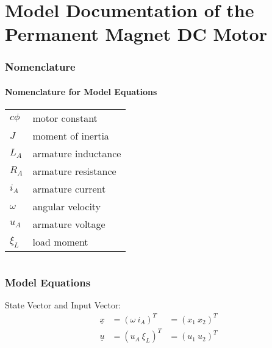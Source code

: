 \documentclass[10pt,a4paper]{article}
\begin{document}
	\part*{Model Documentation of the \\ Permanent Magnet DC Motor} %
	
	
	\section{Nomenclature} %
	\subsection{Nomenclature for Model Equations} %
	
	\begin{tabular}{ll}
		$c\phi$ & motor constant \\
		$J$ & moment of inertia \\
		$L_A$ & armature inductance \\
		$R_A$ & armature resistance \\
		$i_A$ & armature current \\
		$\omega$ & angular velocity \\
		$u_A$ & armature voltage \\
		$\xi_L$ & load moment \\
				
	\end{tabular}
	 
	
	\begin{tabular}{ll}

	\end{tabular}
	
	
	\section{Model Equations} %
	
	State Vector and Input Vector:
	\begin{align*}
		\underline{x} &= (\omega \ i_A)^T &= (x_1 \ x_2)^T \\
		\underline{u} &= (u_A \ \xi_L)^T &= (u_1 \ u_2)^T \\
	\end{align*}
	
\end{document}
